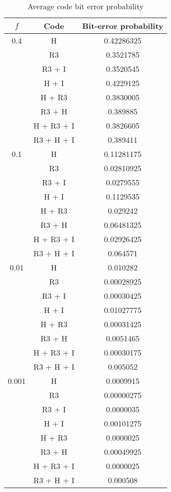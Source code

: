 \documentclass[10pt,a4paper,oneside,onecolumn]{article}
\begin{document}
\begin{table}[ht]
\centering
\begin{tabular}{| c | c | c |}
\hline
$f$ & Code & Bit-error probability \\
\hline
0.4 & H          & 0.42286325 \\
    & R3         & 0.3521785 \\
    & R3 + I     & 0.3520545 \\
    & H + I      & 0.4229125 \\
    & H + R3     & 0.3830005 \\
    & R3 + H     & 0.389885 \\
    & H + R3 + I & 0.3826605 \\
    & R3 + H + I & 0.389411 \\
\hline
0.1 & H          & 0.11281175 \\
    & R3         & 0.02810925 \\
    & R3 + I     & 0.0279555 \\
    & H + I      & 0.1129535 \\
    & H + R3     & 0.029242 \\
    & R3 + H     & 0.06481325 \\
    & H + R3 + I & 0.02926425 \\
    & R3 + H + I & 0.064571 \\
\hline
0.01 & H          & 0.010282 \\
     & R3         & 0.00028925 \\
     & R3 + I     & 0.00030425 \\
     & H + I      & 0.01027775 \\
     & H + R3     & 0.00031425 \\
     & R3 + H     & 0.0051465 \\
     & H + R3 + I & 0.00030175 \\
     & R3 + H + I & 0.005052 \\
\hline
0.001 & H          & 0.0009915 \\
      & R3         & 0.00000275 \\
      & R3 + I     & 0.0000035 \\
      & H + I      & 0.00101275 \\
      & H + R3     & 0.0000025 \\
      & R3 + H     & 0.00049925 \\
      & H + R3 + I & 0.0000025 \\
      & R3 + H + I & 0.000508 \\
\hline

\end{tabular}
\caption{Average code bit error probability}
\label{tbl:code-errors}
\end{table}
\end{document}
